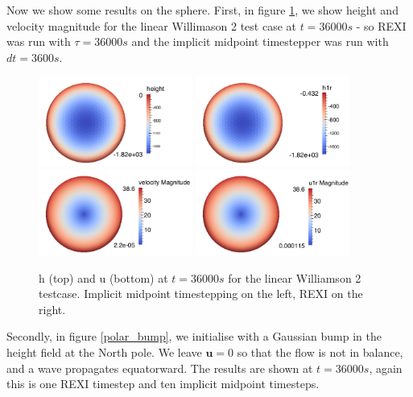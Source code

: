 \documentclass[14pt]{article}
\def\MM#1{\boldsymbol{#1}}
\begin{document}
Now we show some results on the sphere. First, in figure \ref{linW2},
we show height and velocity magnitude for the linear Willimason 2 test
case at $t=36000s$ - so REXI was run with $\tau=36000s$ and the
implicit midpoint timestepper was run with $dt=3600s$.

\begin{figure}
  \centering
  \includegraphics[width=0.45\textwidth]{results/im_h_w2lin_t36000}
  \includegraphics[width=0.45\textwidth]{results/rexi_h_w2lin_t36000}\\
  \includegraphics[width=0.45\textwidth]{results/im_u_w2lin_t36000}
  \includegraphics[width=0.45\textwidth]{results/rexi_u_w2lin_t36000}\\
  \caption{h (top) and u (bottom) at $t=36000s$ for the linear Williamson 2 testcase. Implicit midpoint timestepping on the left, REXI on the right.}
  \label{linW2}
\end{figure}

Secondly, in figure \ref{polar_bump}, we initialise with a Gaussian
bump in the height field at the North pole. We leave $\MM{u}=0$ so
that the flow is not in balance, and a wave propagates
equatorward. The results are shown at $t=36000s$, again this is one
REXI timestep and ten implicit midpoint timesteps.
\end{document}
